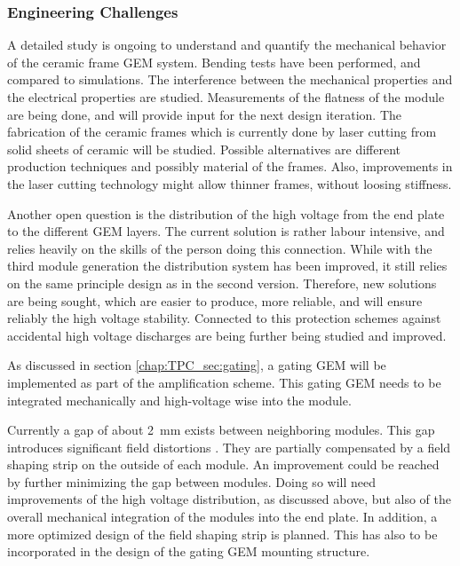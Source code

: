 \subsubsection{Engineering Challenges}
A detailed study is ongoing to understand and quantify the mechanical behavior of the ceramic frame GEM system. Bending tests have been performed, and compared to simulations. The interference between the mechanical properties and the electrical properties are studied. Measurements of the flatness of the module are being done, and will provide input for the next design iteration.
The fabrication of the ceramic frames which is currently done by laser cutting from solid sheets of ceramic will be studied. Possible alternatives are different production techniques and possibly material of the frames. Also, improvements in the laser cutting technology might allow thinner frames, without loosing stiffness.

Another open question is the distribution of the high voltage from the end plate to the different GEM layers. 
The current solution is rather labour intensive, and relies heavily on the skills of the person doing this connection. 
While with the third module generation the distribution system has been improved, it still relies on the same principle design as in the second version. 
Therefore, new solutions are being sought, which are easier to produce, more reliable, and will ensure reliably the high voltage stability. 
Connected to this protection schemes against accidental high voltage discharges are being further being studied and improved.

As discussed in section \ref{chap:TPC_sec:gating}, a gating GEM will be implemented as part of the amplification scheme. This gating GEM needs to be integrated mechanically and high-voltage wise into the module.

Currently a gap of about \SI{2}{mm} exists between neighboring modules. This gap introduces significant field distortions \cite{Zenker:2014qra}. They are partially compensated by a field shaping strip on the outside of each module. 
An improvement could be reached by further minimizing the gap between modules. Doing so will need improvements of the high voltage distribution, as discussed above, but also of the overall mechanical integration of the modules into the end plate. In addition, a more optimized design of the field shaping strip is planned. This has also to be incorporated in the design of the gating GEM mounting structure.
